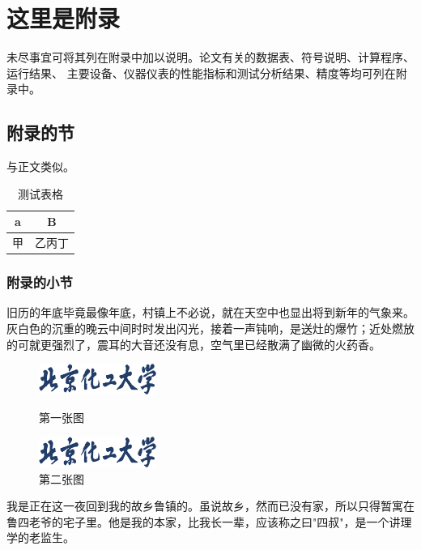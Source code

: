 \chapter{这里是附录}\label{app:1}
未尽事宜可将其列在附录中加以说明。论文有关的数据表、符号说明、计算程序、运行结果、
主要设备、仪器仪表的性能指标和测试分析结果、精度等均可列在附录中。
\section{附录的节}
与正文类似。
\begin{table}[ht]
	\centering
	\caption{测试表格}\label{tab:mytable}
	\begin{tabular}{cc}
		\toprule
		a & B   \\
		\midrule
		甲   & 乙丙丁 \\
		\bottomrule
	\end{tabular}
\end{table}

\subsection{附录的小节}
旧历的年底毕竟最像年底，村镇上不必说，就在天空中也显出将到新年的气象来。灰白色的沉重的晚云中间时时发出闪光，接着一声钝响，是送灶的爆竹；近处燃放的可就更强烈了，震耳的大音还没有息，空气里已经散满了幽微的火药香。

\begin{figure}[ht]
	\centering
	\begin{minipage}{0.3\textwidth}
		\centering
		\includegraphics[height=1cm]{figure/ZNName.png}
		\caption{第一张图}\label{fig:test1}
	\end{minipage}
	\hspace{2cm}
	\begin{minipage}{0.3\textwidth}
		\centering
		\includegraphics[height=1cm]{figure/ZNName.png}
		\caption{第二张图}\label{fig:test2}
	\end{minipage}
\end{figure}

我是正在这一夜回到我的故乡鲁镇的。虽说故乡，然而已没有家，所以只得暂寓在鲁四老爷的宅子里。他是我的本家，比我长一辈，应该称之曰"四叔"，是一个讲理学的老监生。

